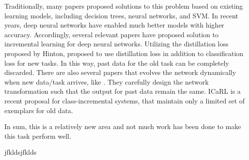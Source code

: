 Traditionally, many papers proposed solutions to this problem based on existing learning models, including decision trees\cite{utgoff1989incremental}, neural networks\cite{polikar2001learn++}, and SVM\cite{diehl2003svm}. In recent years, deep neural networks have enabled much better models with higher accuracy. Accordingly, several relevant papers have proposed solution to incremental learning for deep neural networks. Utilizing the distillation loss proposed by Hinton\cite{hinton2015distilling}, \cite{li2017learning} proposed to use distillation loss in addition to classification loss for new tasks. In this way, past data for the old task can be completely discarded. There are also several papers that evolves the network dynamically when new data/task arrives, like \cite{yoon2017lifelong,rosenfeld2017incremental,sarwar2017incremental,rusu2016progressive}. They carefully design the network transformation such that the output for past data remain the same. ICaRL\cite{rebuffi2017icarl} is a recent proposal for class-incremental systems, that maintain only a limited set of exemplars for old data.

In sum, this is a relatively new area and not much work has been done to make this task perform well.





\parencite{Meta_CN}jfkldsjfklds
